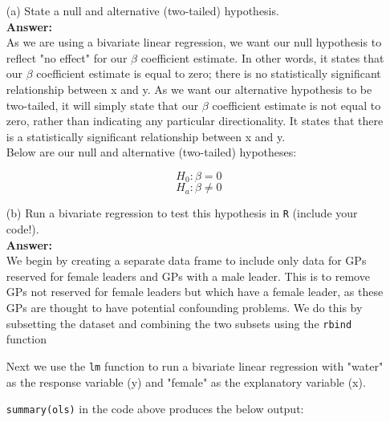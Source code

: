 \documentclass[12pt,letterpaper]{article}
\begin{document}
\newpage
\begin{enumerate}
	\item [(a)] State a null and alternative (two-tailed) hypothesis.\\
	
	\textbf{Answer:}\\
	
	As we are using a bivariate linear regression, we want our null hypothesis to reflect "no effect" for our $\beta$ coefficient estimate. In other words, it states that our $\beta$ coefficient estimate is equal to zero; there is no statistically significant relationship between x and y. As we want our alternative hypothesis to be two-tailed, it will simply state that our $\beta$ coefficient estimate is not equal to zero, rather than indicating any particular directionality. It states that there is a statistically significant relationship between x and y.\\
	
	Below are our null and alternative (two-tailed) hypotheses:
	
	\[H_0: \beta = 0 \]
	\[H_a : \beta \neq 0 \]
	
	\vspace{.5cm}

	\item [(b)] Run a bivariate regression to test this hypothesis in \texttt{R} (include your code!).\\
	
	\textbf{Answer:}\\
	
	We begin by creating a separate data frame to include only data for GPs reserved for female leaders and GPs with a male leader. This is to remove GPs not reserved for female leaders but which have a female leader, as these GPs are thought to have potential confounding problems. We do this by subsetting the dataset and combining the two subsets using the \texttt{rbind} function
	
	Next we use the \texttt{lm} function to run a bivariate linear regression with "water" as the response variable (y) and "female" as the explanatory variable (x).
	
	\vspace{.5cm}
	
	
	
	\vspace{.5cm}
	
	 \texttt{summary(ols)} in the code above produces the below output:\\
	 

\end{enumerate}
\end{document}
